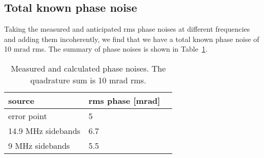 \documentclass{ligodoc}
\begin{document}






\subsection{Total known phase noise}
Taking the measured and anticipated rms phase noises at different
frequencies and adding them incoherently, we find that we have a total
known phase noise of 10 mrad rms. The summary of phase noises is shown
in Table~\ref{tab:phasenoises}.

\begin{table}
\centering
\caption{Measured and calculated phase noises. The quadrature sum is
  10 mrad rms.}
\begin{tabular}{l l l}
\hline
source & rms phase [mrad]\\
\hline
error point & 5 \\
14.9 MHz sidebands & 6.7 \\
9 MHz sidebands & 5.5 \\
\hline
\end{tabular}
\label{tab:phasenoises}
\end{table}
\end{document}

